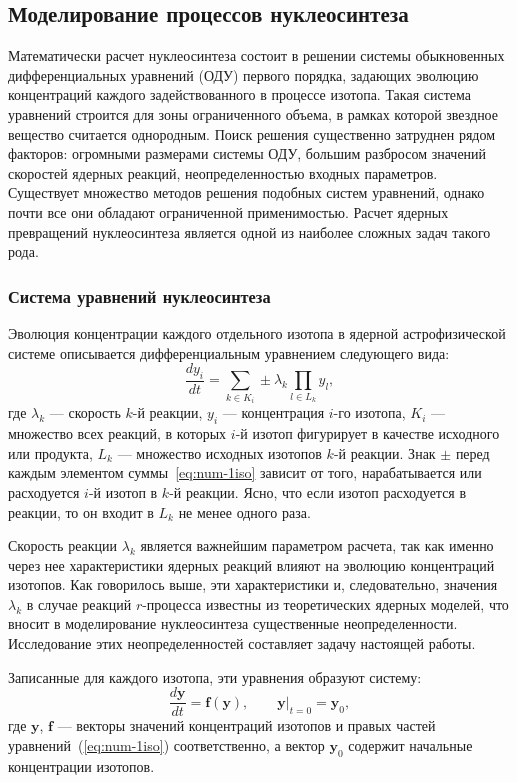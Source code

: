 \subsection{Моделирование процессов нуклеосинтеза}
\label{sec:nucleosynthesis}
Математически расчет нуклеосинтеза состоит в решении системы обыкновенных дифференциальных уравнений (ОДУ) первого порядка, задающих эволюцию концентраций каждого задействованного в процессе изотопа. Такая система уравнений строится для зоны ограниченного объема, в рамках которой звездное вещество считается однородным. Поиск решения существенно затруднен рядом факторов: огромными размерами системы ОДУ, большим разбросом значений скоростей ядерных реакций, неопределенностью входных параметров. Существует множество методов решения подобных систем уравнений, однако почти все они обладают ограниченной применимостью. Расчет ядерных превращений нуклеосинтеза является одной из наиболее сложных задач такого рода.

\subsubsection{Система уравнений нуклеосинтеза}
Эволюция концентрации каждого отдельного изотопа в ядерной астрофизической системе описывается дифференциальным уравнением следующего вида:
\begin{equation}
\displaystyle \frac{d y_i}{d t} = \sum_{k \in K_i} \pm \lambda_k \prod_{l \in L_k} y_l,
\label{eq:num-1iso}
\end{equation}
где $\lambda_k$ --- скорость $k$-й реакции, $y_i$ --- концентрация $i$-го изотопа,  $K_i$ --- множество всех реакций, в которых $i$-й изотоп фигурирует в качестве исходного или продукта, $L_k$ --- множество исходных изотопов $k$-й реакции. Знак $\pm$ перед каждым элементом суммы~\ref{eq:num-1iso} зависит от того, нарабатывается или расходуется $i$-й изотоп в $k$-й реакции. Ясно, что если изотоп расходуется в реакции, то он входит в $L_k$ не менее одного раза.

Скорость реакции $\lambda_k$ является важнейшим параметром расчета, так как именно через нее характеристики ядерных реакций влияют на эволюцию концентраций изотопов. Как говорилось выше, эти характеристики и, следовательно, значения $\lambda_k$ в случае реакций $r$-процесса известны из теоретических ядерных моделей, что вносит в моделирование нуклеосинтеза существенные неопределенности. Исследование этих неопределенностей составляет задачу настоящей работы.

Записанные для каждого изотопа, эти уравнения образуют систему:
\begin{equation}
\displaystyle
\frac{d \bm{y}}{d t} = \bm{f}(\bm{y}), \qquad \bm{y} \bigg\rvert_{t=0} = \bm{y}_0,
\label{eq:num-system}
\end{equation}
где $\bm{y}$, $\bm{f}$ --- векторы значений концентраций изотопов и правых частей уравнений~(\ref{eq:num-1iso}) соответственно, а вектор $\bm{y}_0$ содержит начальные концентрации изотопов. 

